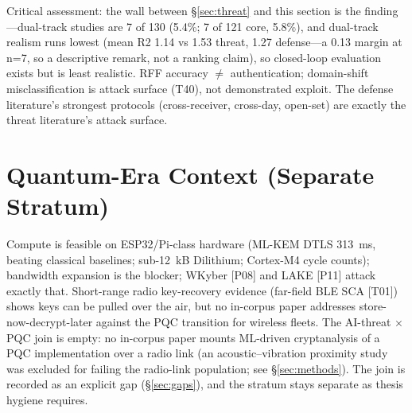 Critical assessment: the wall between \S\ref{sec:threat} and this section is the finding---dual-track studies are 7 of 130 (5.4\%; 7 of 121 core, 5.8\%), and dual-track realism runs lowest (mean R2 1.14 vs 1.53 threat, 1.27 defense---a 0.13 margin at n=7, so a descriptive remark, not a ranking claim), so closed-loop evaluation exists but is least realistic. RFF accuracy $\ne$ authentication; domain-shift misclassification is attack surface (T40), not demonstrated exploit. The defense literature's strongest protocols (cross-receiver, cross-day, open-set) are exactly the threat literature's attack surface.

\section{Quantum-Era Context (Separate Stratum)}
\label{sec:pqc}
Compute is feasible on ESP32/Pi-class hardware (ML-KEM DTLS 313~ms, beating classical baselines; sub-12~kB Dilithium; Cortex-M4 cycle counts); bandwidth expansion is the blocker; WKyber [P08] and LAKE [P11] attack exactly that. Short-range radio key-recovery evidence (far-field BLE SCA [T01]) shows keys can be pulled over the air, but no in-corpus paper addresses store-now-decrypt-later against the PQC transition for wireless fleets. The AI-threat $\times$ PQC join is empty: no in-corpus paper mounts ML-driven cryptanalysis of a PQC implementation over a radio link (an acoustic--vibration proximity study was excluded for failing the radio-link population; see \S\ref{sec:methods}). The join is recorded as an explicit gap (\S\ref{sec:gaps}), and the stratum stays separate as thesis hygiene requires.

